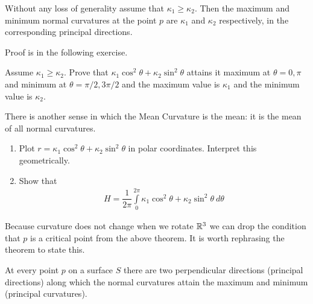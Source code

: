 \begin{thm}
	\label{thm:extremal_curvatures}
	Without any loss of generality assume that $\kappa_1 \ge \kappa_2$. Then the maximum and minimum normal curvatures at the point $p$ are $\kappa_1$ and $\kappa_2$ respectively, in the corresponding principal directions.
\end{thm}
\noindent Proof is in the following exercise.
\begin{ques}
	Assume $\kappa_1 \ge \kappa_2$. Prove that $\kappa_1 \cos^2 \theta  + \kappa_2 \sin^2 \theta$ attains it maximum at $ \theta = 0, \pi$ and minimum at $ \theta = \pi/2, 3 \pi/2$ and the maximum value is $ \kappa_1$ and the minimum value is $ \kappa_2$.
\end{ques}
\begin{ques} There is another sense in which the Mean Curvature is the mean: it is the mean of all normal curvatures.
	\begin{enumerate}
		\item Plot $ r=\kappa_1 \cos^2 \theta  + \kappa_2 \sin^2 \theta$ in polar coordinates. Interpret this geometrically.
		\item Show that
		\begin{align*}
			H = \dfrac{1}{2 \pi} \int \limits_{0}^{2 \pi } \kappa_1 \cos^2 \theta  + \kappa_2 \sin^2 \theta \: d \theta
		\end{align*}
	\end{enumerate}
\end{ques}
\begin{remark}
	Because curvature does not change when we rotate $\mathbb{R}^3$ we can drop the condition that $p$ is a critical point from the above theorem. It is worth rephrasing the theorem to state this.
\end{remark}
\begin{thm}
	At every point $p$ on a surface $S$ there are two perpendicular directions (principal directions) along which the normal curvatures attain the maximum and minimum (principal curvatures).
\end{thm}

